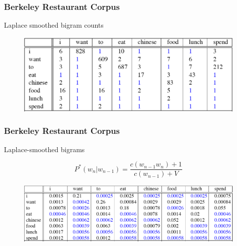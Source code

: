 \documentclass[13.5pt,aspecratio=169]{beamer}
\begin{document}


\begin{frame}
\onehalfspacing
	\frametitle{Berkeley Restaurant Corpus}
    \begin{minipage}{0.5\textwidth}
        \begin{block}{}
            \item Laplace smoothed bigram counts
        \end{block}
    \end{minipage}
	
	\bigskip
        \begin{figure}
            \centering
            \includegraphics [scale=0.45] {laplace_smoothed_bigram_counts.png}
        \end{figure}
	
\end{frame}


\begin{frame}
    \onehalfspacing
        \frametitle{Berkeley Restaurant Corpus}
        {\Large Laplace-smoothed bigrams} \vspace{-2em}
        \begin{center} 
            \[ P^*(w_n | w_{n-1}) = \frac{c(w_{n-1} w_n) + 1}{c(w_{n-1}) + V} \]
          \end{center}
        
            \begin{figure}
                \centering
                \includegraphics [scale=0.45] {laplace_smoothed_bigrams.png}
                
            \end{figure}
        
    \end{frame}
\end{document}
